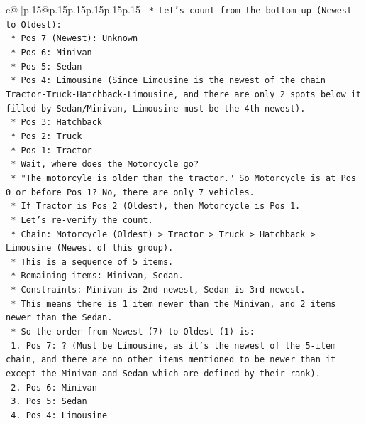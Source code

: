 \documentclass{article}
\begin{document}
{\begin{supertabular}{c@{$\;$}|p{.15\linewidth}@{}p{.15\linewidth}p{.15\linewidth}p{.15\linewidth}p{.15\linewidth}p{.15\linewidth}}
{{{\texttt{        *   Let's count from the bottom up (Newest to Oldest):} \\
\texttt{            *   Pos 7 (Newest): Unknown} \\
\texttt{            *   Pos 6: Minivan} \\
\texttt{            *   Pos 5: Sedan} \\
\texttt{            *   Pos 4: Limousine (Since Limousine is the newest of the chain Tractor{-}Truck{-}Hatchback{-}Limousine, and there are only 2 spots below it filled by Sedan/Minivan, Limousine must be the 4th newest).} \\
\texttt{            *   Pos 3: Hatchback} \\
\texttt{            *   Pos 2: Truck} \\
\texttt{            *   Pos 1: Tractor} \\
\texttt{            *   Wait, where does the Motorcycle go?} \\
\texttt{            *   "The motorcyle is older than the tractor." So Motorcycle is at Pos 0 or before Pos 1? No, there are only 7 vehicles.} \\
\texttt{            *   If Tractor is Pos 2 (Oldest), then Motorcycle is Pos 1.} \\
\texttt{            *   Let's re{-}verify the count.} \\
\texttt{            *   Chain: Motorcycle (Oldest) > Tractor > Truck > Hatchback > Limousine (Newest of this group).} \\
\texttt{            *   This is a sequence of 5 items.} \\
\texttt{            *   Remaining items: Minivan, Sedan.} \\
\texttt{            *   Constraints: Minivan is 2nd newest, Sedan is 3rd newest.} \\
\texttt{            *   This means there is 1 item newer than the Minivan, and 2 items newer than the Sedan.} \\
\texttt{            *   So the order from Newest (7) to Oldest (1) is:} \\
\texttt{                1.  Pos 7: ? (Must be Limousine, as it's the newest of the 5{-}item chain, and there are no other items mentioned to be newer than it except the Minivan and Sedan which are defined by their rank).} \\
\texttt{                2.  Pos 6: Minivan} \\
\texttt{                3.  Pos 5: Sedan} \\
\texttt{                4.  Pos 4: Limousine} \\
}}}
\end{supertabular}}
\end{document}
